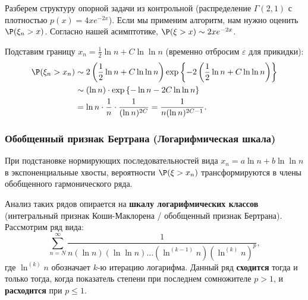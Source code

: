 Разберем структуру опорной задачи из контрольной (распределение $\Gamma(2,1)$ с плотностью $p(x) = 4xe^{-2x}$). Если мы применим алгоритм, нам нужно оценить $\P(\xi_n > x)$. 
Согласно нашей асимптотике, $\P(\xi > x) \sim 2x e^{-2x}$.

Подставим границу $x_n = \frac{1}{2}\ln n + C \ln\ln n$ (временно отбросим $\varepsilon$ для прикидки):
\begin{align*}
    \P(\xi_n > x_n) &\sim 2 \left( \frac{1}{2}\ln n + C\ln\ln n \right) \exp\left\{ -2 \left( \frac{1}{2}\ln n + C \ln\ln n \right) \right\} \\
    &\sim (\ln n) \cdot \exp\left\{ -\ln n - 2C\ln\ln n \right\} \\
    &= \ln n \cdot \frac{1}{n} \cdot \frac{1}{(\ln n)^{2C}} = \frac{1}{n (\ln n)^{2C-1}}.
\end{align*}

\subsubsection*{Обобщенный признак Бертрана (Логарифмическая шкала)}
При подстановке нормирующих последовательностей вида $x_n = a \ln n + b \ln \ln n$ в экспоненциальные хвосты, вероятности $\P(\xi > x_n)$ трансформируются в члены обобщенного гармонического ряда. 

Анализ таких рядов опирается на \textbf{шкалу логарифмических классов} (интегральный признак Коши-Маклорена / обобщенный признак Бертрана).
Рассмотрим ряд вида:
\[ \sum_{n=N}^{\infty} \frac{1}{n (\ln n) (\ln \ln n) \dots (\ln^{(k-1)} n) (\ln^{(k)} n)^p}, \]
где $\ln^{(k)} n$ обозначает $k$-ю итерацию логарифма. 
Данный ряд \textbf{сходится} тогда и только тогда, когда показатель степени при последнем сомножителе $p > 1$, и \textbf{расходится} при $p \le 1$.


